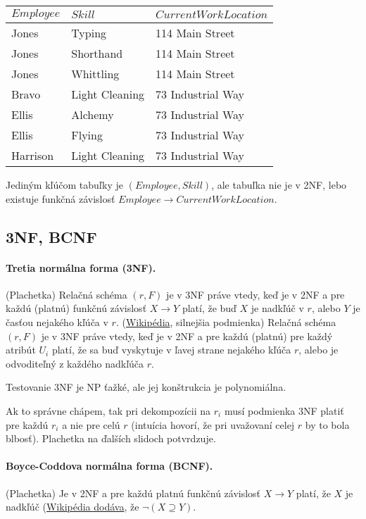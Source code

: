 \documentclass[10pt,a4paper]{article}
\begin{document}
\begin{center}
\begin{tabular}{l|l|l}
$Employee$ & $Skill$ & $Current Work Location$ \\
\hline
Jones &	Typing &	114 Main Street \\
Jones &	Shorthand &	114 Main Street \\
Jones &	Whittling &	114 Main Street \\
Bravo &	Light Cleaning &	73 Industrial Way \\
Ellis &	Alchemy &	73 Industrial Way \\
Ellis &	Flying &	73 Industrial Way \\
Harrison &	Light Cleaning &	73 Industrial Way \\
\end{tabular}
\end{center}

Jediným kľúčom tabuľky je $(Employee, Skill)$, ale tabuľka nie je v 2NF, lebo existuje funkčná závislosť $Employee \rightarrow Current Work Location$.

\subsection{3NF, BCNF}

\paragraph{Tretia normálna forma (3NF).} (Plachetka) Relačná schéma $(r,F)$ je v 3NF práve vtedy, keď je v 2NF a pre každú (platnú) funkčnú závislosť $X \rightarrow Y$ platí, že buď $X$ je nadkľúč v $r$, alebo $Y$ je časťou nejakého kľúča v $r$. 
(\href{http://en.wikipedia.org/wiki/Third_normal_form}{Wikipédia}, silnejšia podmienka) Relačná schéma $(r,F)$ je v 3NF práve vtedy, keď je v 2NF a pre každú (platnú) pre každý atribút $U_i$ platí, že sa buď vyskytuje v ľavej strane nejakého kľúča $r$, alebo je odvoditeľný z každého nadkľúča $r$.

Testovanie 3NF je NP ťažké, ale jej konštrukcia je polynomiálna. 

Ak to správne chápem, tak pri dekompozícii na $r_i$ musí podmienka 3NF platiť pre každú $r_i$ a nie pre celú $r$ (intuícia hovorí, že pri uvažovaní celej $r$ by to bola blbosť). 
Plachetka na ďalších slidoch potvrdzuje. 

\paragraph{Boyce-Coddova normálna forma (BCNF).} (Plachetka) Je v 2NF a pre každú platnú funkčnú závislosť $X \rightarrow Y$ platí, že $X$ je nadkľúč (\href{http://en.wikipedia.org/wiki/Boyce\%E2\%80\%93Codd_normal_form}{Wikipédia dodáva}, že $\neg (X \supseteq Y)$. 
\end{document}
